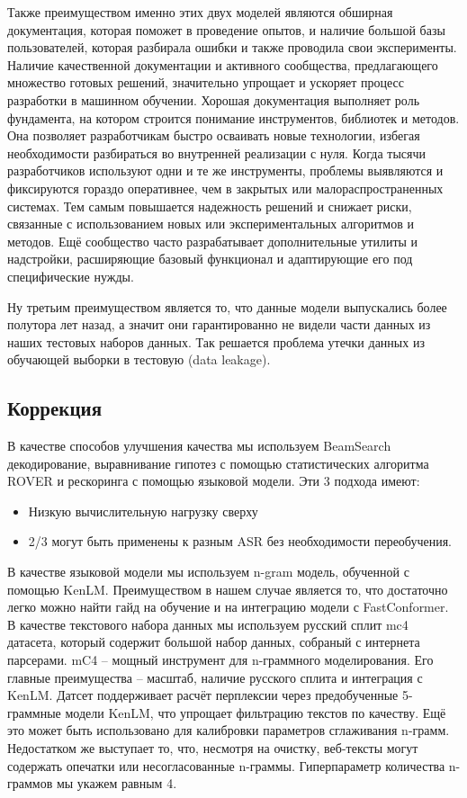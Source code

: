 Также преимуществом именно этих двух моделей являются обширная документация, которая поможет в проведение опытов, и наличие большой базы пользователей, которая разбирала ошибки и также проводила свои эксперименты.
Наличие качественной документации и активного сообщества, предлагающего множество готовых решений, значительно упрощает и ускоряет процесс разработки в машинном обучении. Хорошая документация выполняет роль фундамента, на котором строится понимание инструментов, библиотек и методов.
Она позволяет разработчикам быстро осваивать новые технологии, избегая необходимости разбираться во внутренней реализации с нуля.
Когда тысячи разработчиков используют одни и те же инструменты, проблемы выявляются и фиксируются гораздо оперативнее, чем в закрытых или малораспространенных системах.
Тем самым повышается надежность решений и снижает риски, связанные с использованием новых или экспериментальных алгоритмов и методов.
Ещё сообщество часто разрабатывает дополнительные утилиты и надстройки, расширяющие базовый функционал и адаптирующие его под специфические нужды.

Ну третьим преимуществом является то, что данные модели выпускались более полутора лет назад, а значит они гарантированно не видели части данных из наших тестовых наборов данных.
Так решается проблема утечки данных из обучающей выборки в тестовую (data leakage).

\subsection{Коррекция}

В качестве способов улучшения качества мы используем BeamSearch декодирование, выравнивание гипотез с помощью статистических алгоритма ROVER и рескоринга с помощью языковой модели.
Эти 3 подхода имеют:
\begin{itemize}
  \item Низкую вычислительную нагрузку сверху
  \item 2/3 могут быть применены к разным ASR без необходимости переобучения.
\end{itemize}

В качестве языковой модели мы используем n-gram модель, обученной с помощью KenLM\cite{heafield2011kenlm}.
Преимуществом в нашем случае является то, что достаточно легко можно найти гайд на обучение и на интеграцию модели с FastConformer.
В качестве текстового набора данных мы используем русский сплит mc4 датасета, который содержит большой набор данных, собраный с интернета парсерами.
mC4\cite{xue2020mt5,raffel2020exploring} -- мощный инструмент для n-граммного моделирования.
Его главные преимущества -- масштаб, наличие русского сплита и интеграция с KenLM.
Датсет поддерживает расчёт перплексии через предобученные 5-граммные модели KenLM, что упрощает фильтрацию текстов по качеству.
Ещё это может быть использовано для калибровки параметров сглаживания n-грамм.
Недостатком же выступает то, что, несмотря на очистку, веб-тексты могут содержать опечатки или несогласованные n-граммы.
Гиперпараметр количества n-граммов мы укажем равным 4.

